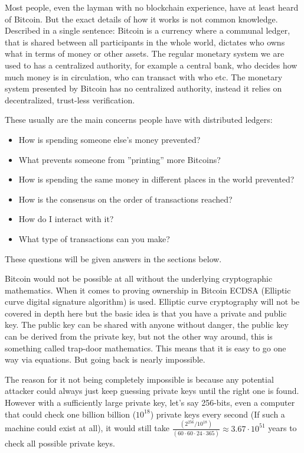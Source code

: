 Most people, even the layman with no blockchain experience, have at least heard
of Bitcoin. But the exact details of how it works is not common knowledge.
Described in a single sentence: Bitcoin is a currency where a communal ledger,
that is shared between all participants in the whole world, dictates who owns what in terms of money or other assets.
The regular monetary system we are
used to has a centralized authority, for example a central bank, who decides
how much money is in circulation, who can transact with who etc. The monetary
system presented by Bitcoin has no centralized authority, instead it relies on
decentralized, trust-less verification.

These usually are the main concerns people have with distributed ledgers:
\begin{itemize}
	\item How is spending someone else's money prevented?
	\item What prevents someone from ''printing'' more Bitcoins?
	\item How is spending the same money in different places in the world prevented?
	\item How is the consensus on the order of transactions reached?
	\item How do I interact with it?
	\item What type of transactions can you make?
\end{itemize}

These questions will be given answers in the sections below.

Bitcoin would not be possible at all without the underlying cryptographic
mathematics. When it comes to proving ownership in Bitcoin ECDSA (Elliptic curve
digital signature algorithm)\cite{ecc_def} is used. Elliptic curve cryptography
will not be covered in depth here but the basic idea is that you have a private
and public key. The public key can be shared with anyone without danger, the
public key can be derived from the private key, but not the other way around,
this is something called trap-door mathematics.\cite{ecc_def}\cite{antonopoulos_2017}
This means that it is easy to go one way via equations. But going back is
nearly impossible.

The reason for it not being completely impossible is because any potential
attacker could always just keep guessing private keys until the right one is
found. However with a sufficiently large private key, let's say 256-bits, even a
computer that could check one billion billion ($10^{18}$) private keys every
second (If such a machine could exist at all), it would still take
$\frac{(2^{256} / 10^{18})}{(60\cdot60\cdot24\cdot365)}\approx3.67\cdot10^{51}$
years to check all possible private keys.

